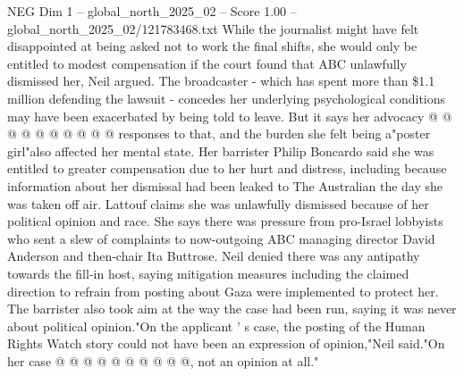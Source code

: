 \begin{textsample}{NEG Dim 1 – global\_north\_2025\_02 – Score 1.00 – global\_north\_2025\_02/121783468.txt}
While the journalist might have felt disappointed at being asked not to work the final shifts, she would only be entitled to modest compensation if the court found that ABC unlawfully dismissed her, Neil argued.
The broadcaster - which has spent more than \$1.1 million defending the lawsuit - concedes her underlying psychological conditions may have been exacerbated by being told to leave.
But it says her advocacy @ @ @ @ @ @ @ @ @ @ responses to that, and the burden she felt being a"poster girl"also affected her mental state.
Her barrister Philip Boncardo said she was entitled to greater compensation due to her hurt and distress, including because information about her dismissal had been leaked to The Australian the day she was taken off air.
Lattouf claims she was unlawfully dismissed because of her political opinion and race.
She says there was pressure from pro-Israel lobbyists who sent a slew of complaints to now-outgoing ABC managing director David Anderson and then-chair Ita Buttrose.
Neil denied there was any antipathy towards the fill-in host, saying mitigation measures including the claimed direction to refrain from posting about Gaza were implemented to protect her.
The barrister also took aim at the way the case had been run, saying it was never about political opinion."On the applicant ' s case, the posting of the Human Rights Watch story could not have been an expression of opinion,"Neil said."On her case @ @ @ @ @ @ @ @ @ @, not an opinion at all."

\end{textsample}
